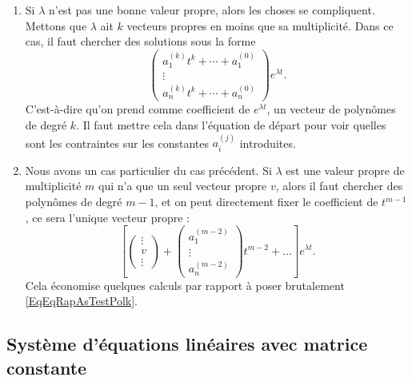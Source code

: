 \begin{enumerate}
	\item
	      Si \( \lambda\) n'est pas une bonne valeur propre, alors les choses se compliquent. Mettons que \( \lambda\) ait \( k\) vecteurs propres en moins que sa multiplicité. Dans ce cas, il faut chercher des solutions sous la forme
	      \begin{equation}		\label{EqEqRapAsTestPolk}
		      \begin{pmatrix}
			      a^{(k)}_1t^k+\cdots+a_1^{(0)} \\
			      \vdots                        \\
			      a^{(k)}_nt^k+\cdots+a_n^{(0)}
		      \end{pmatrix} e^{\lambda t}.
	      \end{equation}
	      C'est-à-dire qu'on prend comme coefficient de \(  e^{\lambda t}\), un vecteur de polynômes de degré \( k\). Il faut mettre cela dans l'équation de départ pour voir quelles sont les contraintes sur les constantes \( a_i^{(j)}\) introduites.

	\item\label{ItemRapSystDe}
	      Nous avons un cas particulier du cas précédent. Si \( \lambda\) est une valeur propre de multiplicité \( m\) qui n'a que un seul vecteur propre \( v\), alors il faut chercher des polynômes de degré \( m-1\), et on peut directement fixer le coefficient de \( t^{m-1}\), ce sera l'unique vecteur propre :
	      \begin{equation}
		      \left[
			      \begin{pmatrix}
				      \vdots \\
				      v      \\
				      \vdots
			      \end{pmatrix}+
			      \begin{pmatrix}
				      a_1^{(m-2)} \\
				      \vdots      \\
				      a_n^{(m-2)}
			      \end{pmatrix}t^{m-2}+\ldots
			      \right] e^{\lambda t}.
	      \end{equation}
	      Cela économise quelques calculs par rapport à poser brutalement \eqref{EqEqRapAsTestPolk}.

\end{enumerate}
\let\theenumi\oldTheEnumi

\subsection{Système d'équations linéaires avec matrice constante}

